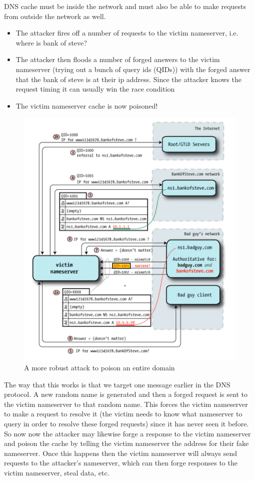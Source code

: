 \documentclass[../notes.tex]{subfiles}
\begin{document}
DNS cache must be inside the network and must also be able to make requests from outside the network as well.

\begin{itemize}
    \item The attacker fires off a number of requests to the victim nameserver, i.e. where is bank of steve?
    \item The attacker then floods a number of forged answers to the victim nameserver (trying out a bunch of query ids (QIDs)) with the forged answer that the bank of steve is at their ip address. Since the attacker knows the request timing it can usually win the race condition
    \item The victim nameserver cache is now poisoned!
\end{itemize}


\begin{figure}[H]
    \centering
    \includegraphics[width=0.8\linewidth]{img/image_2023-03-30-03-18-23.png}
    \caption{A more robust attack to poison an entire domain}
\end{figure}

The way that this works is that we target one message earlier in the DNS protocol.
A new random name is generated and then a forged request is sent to the victim nameserver to that random name.
This forces the victim nameserver to make a request to resolve it (the victim needs to know what nameserver to query in order to resolve these forged requests) since it has never seen it before.
So now now the attacker may likewise forge a response to the victim nameserver and poison the cache by telling the victim nameserver the address for their fake nameserver.
Once this happens then the victim nameserver will always send requests to the attacker's nameserver, which can then forge responses to the victim nameserver, steal data, etc.
\end{document}
